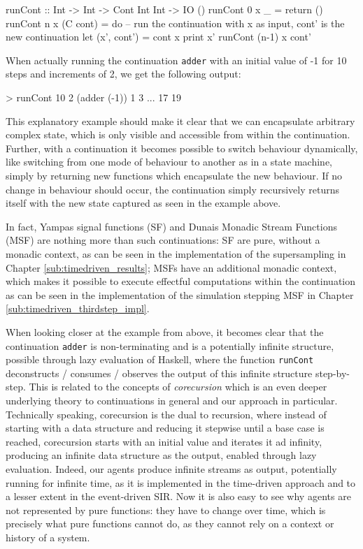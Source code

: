 \begin{HaskellCode}
runCont :: Int -> Int -> Cont Int Int -> IO ()
runCont 0 x _ = return () 
runCont n x (C cont) = do 
  -- run the continuation with x as input, cont' is the new continuation
  let (x', cont') = cont x
  print x'
  runCont (n-1) x cont' 
\end{HaskellCode}

When actually running the continuation \texttt{adder} with an initial value of -1 for 10 steps and increments of 2, we get the following output:

\begin{HaskellCode}
> runCont 10 2 (adder (-1))
1
3
...
17
19
\end{HaskellCode}

This explanatory example should make it clear that we can encapsulate arbitrary complex state, which is only visible and accessible from within the continuation. Further, with a continuation it becomes possible to switch behaviour dynamically, like switching from one mode of behaviour to another as in a state machine, simply by returning new functions which encapsulate the new behaviour. If no change in behaviour should occur, the continuation simply recursively returns itself with the new state captured as seen in the example above.

In fact, Yampas signal functions (SF) and Dunais Monadic Stream Functions (MSF) are nothing more than such continuations: SF are pure, without a monadic context, as can be seen in the implementation of the supersampling in Chapter \ref{sub:timedriven_results}; MSFs have an additional monadic context, which makes it possible to execute effectful computations within the continuation as can be seen in the implementation of the simulation stepping MSF in Chapter \ref{sub:timedriven_thirdstep_impl}. 

\medskip

When looking closer at the example from above, it becomes clear that the continuation \texttt{adder} is non-terminating and is a potentially infinite structure, possible through lazy evaluation of Haskell, where the function \texttt{runCont} deconstructs / consumes / observes the output of this infinite structure step-by-step. This is related to the concepts of \textit{corecursion} which is an even deeper underlying theory to continuations in general and our approach in particular. Technically speaking, corecursion is the dual to recursion, where instead of starting with a data structure and reducing it stepwise until a base case is reached, corecursion starts with an initial value and iterates it ad infinity, producing an infinite data structure as the output, enabled through lazy evaluation. 
Indeed, our agents produce infinite streams as output, potentially running for infinite time, as it is implemented in the time-driven approach and to a lesser extent in the event-driven SIR. Now it is also easy to see why agents are not represented by pure functions: they have to change over time, which is precisely what pure functions cannot do, as they cannot rely on a context or history of a system.

